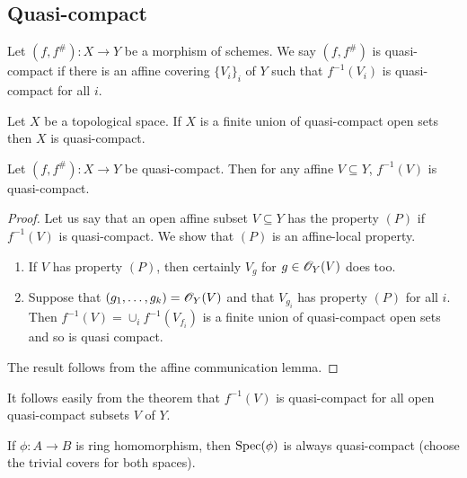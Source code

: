 \documentclass{memoir}
\begin{document}
\subsection{Quasi-compact}
\begin{definition}
    Let $(f,f^\#):X\to Y$ be a morphism of schemes.
    We say $(f,f^\#)$ is quasi-compact if there is an affine covering $\{V_i\}_i$ of $Y$ such that $f^{-1}(V_i)$ is quasi-compact for all $i$.
\end{definition}
\begin{lemma}
    Let $X$ be a topological space.
    If $X$ is a finite union of quasi-compact open sets then $X$ is quasi-compact.
\end{lemma}
\begin{thm}
    Let $(f,f^\#):X\to Y$ be quasi-compact.
    Then for any affine $V\subseteq Y$, $f^{-1}(V)$ is quasi-compact.
\end{thm}
\begin{proof}
    Let us say that an open affine subset $V\subseteq Y$ has the property $(P)$ if $f^{-1}(V)$ is quasi-compact.
    We show that $(P)$ is an affine-local property.
    \begin{enumerate}
        \item If $V$ has property $(P)$, then certainly $V_g$ for $g\in \mathscr{O}_Y(V)$ does too.
        \item Suppose that $(g_1,\dots,g_k) = \mathscr{O}_Y(V)$ and that $V_{g_i}$ has property $(P)$ for all $i$.
            Then $f^{-1}(V) = \cup_if^{-1}(V_{f_i})$ is a finite union of quasi-compact open sets and so is quasi compact.
    \end{enumerate}
    The result follows from the affine communication lemma.
\end{proof}
\begin{remark}
    It follows easily from the theorem that $f^{-1}(V)$ is quasi-compact for all open quasi-compact subsets $V$ of $Y$.
\end{remark}
\begin{remark}
    If $\phi:A\to B$ is ring homomorphism, then $\operatorname{Spec}(\phi)$ is always quasi-compact (choose the trivial covers for both spaces).
\end{remark}
\end{document}

